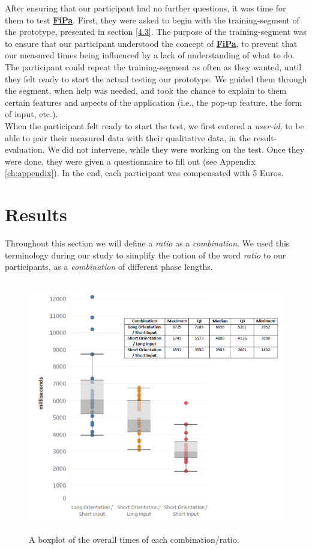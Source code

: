 After ensuring that our participant had no further questions, it was time for them to test \underline{\textbf{FiPa}}. First, they were asked to begin with the training-segment of the prototype, presented in section \ref{4.3}. The purpose of the training-segment was to ensure that our participant understood the concept of \underline{\textbf{FiPa}}, to prevent that our measured times being influenced by a lack of understanding of what to do. The participant could repeat the training-segment as often as they wanted, until they felt ready to start the actual testing our prototype. We guided them through the segment, when help was needed, and took the chance to explain to them certain features and aspects of the application (i.e., the pop-up feature, the form of input, etc.). \\

When the participant felt ready to start the test, we first entered a \textit{user-id}, to be able to pair their measured data with their qualitative data, in the result-evaluation. We did not intervene, while they were working on the test. Once they were done, they were given a questionnaire to fill out (see Appendix \ref{ch:appendix}). In the end, each participant was compensated with 5 Euros.



\section{Results} \label{5.4}

Throughout this section we will define a \textit{ratio} as a \textit{combination}. We used this terminology during our study to simplify the notion of the word \textit{ratio} to our participants, as a \textit{combination} of different phase lengths.

\begin{figure}[t!]
\centering
\includegraphics[width=13cm, height=11cm]{Chapters/graphics/Combinations.png}
\caption{A boxplot of the overall times of each combination/ratio.}
\label{fig:combination}
\end{figure}

